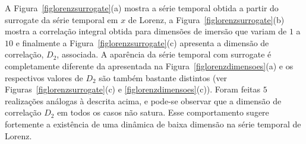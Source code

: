 A Figura~\ref{figlorenzsurrogate}(a) mostra a série temporal obtida a partir do surrogate da série temporal em $x$ de Lorenz, a Figura~\ref{figlorenzsurrogate}(b) mostra a correlação integral obtida para dimensões de imersão que variam de $1$ a $10$ e finalmente a Figura~\ref{figlorenzsurrogate}(c) apresenta a dimensão de correlação, $D_{2}$, associada. A aparência da série temporal com surrogate é completamente diferente da apresentada na Figura~\ref{figlorenzdimensoes}(a) e os respectivos valores de $D_{2}$ são também bastante distintos (ver Figuras~\ref{figlorenzsurrogate}(c) e \ref{figlorenzdimensoes}(c)). Foram feitas $5$ realizações análogas à descrita acima, e pode-se observar que a dimensão de correlação $D_{2}$ em todos os casos não satura. Esse comportamento sugere fortemente a existência de uma dinâmica de baixa dimensão na série temporal de Lorenz. %

